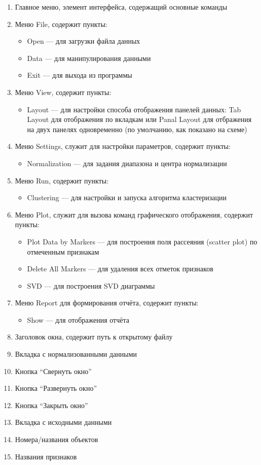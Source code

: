 \documentclass[12pt,twoside,a4paper,tikz,border=5]{refart}
\begin{document}
\begin{enumerate}
	\item Главное меню, элемент интерфейса, содержащий основные команды
	\item Меню File, содержит пункты:
		\begin{itemize}
			\item Open --- для загрузки файла данных
			\item Data --- для манипулирования данными
			\item Exit --- для выхода из программы
		\end{itemize}
	\item Меню View, содержит пункты:
		\begin{itemize}
			\item Layout --- для настройки способа отображения панелей данных: Tab Layout для отображения по вкладкам или Panal Layout для отбражения на двух панелях одновременно (по умолчанию, как показано на схеме) 
		\end{itemize}
	\item Меню Settings, служит для настройки параметров, содержит пункты:
		\begin{itemize}
			\item Normalization --- для задания диапазона и центра нормализации
		\end{itemize}
	\item Меню Run, содержит пункты:
		\begin{itemize}
			\item Clustering --- для настройки и запуска алгоритма кластеризации
		\end{itemize}
	\item Меню Plot, служит для вызова команд графического отображения, содержит пункты:
		\begin{itemize}
			\item Plot Data by Markers --- для построения поля рассеяния (scatter plot) по отмеченным признакам
			\item Delete All Markers --- для удаления всех отметок признаков
			\item SVD --- для построения SVD диаграммы 			
		\end{itemize}
	\item Меню Report для формирования отчёта, содержит пункты:
		\begin{itemize}
			\item Show --- для отображения отчёта 		
		\end{itemize}
	\item Заголовок окна, содержит путь к открытому файлу
	\item Вкладка с нормализованными данными 
	\item Кнопка ``Свернуть окно''
	\item Кнопка ``Развернуть окно''		
	\item Кнопка ``Закрыть окно''
	\item Вкладка с исходными данными 
	\item Номера/названия объектов
	\item Названия признаков
\end{enumerate}
\end{document}
